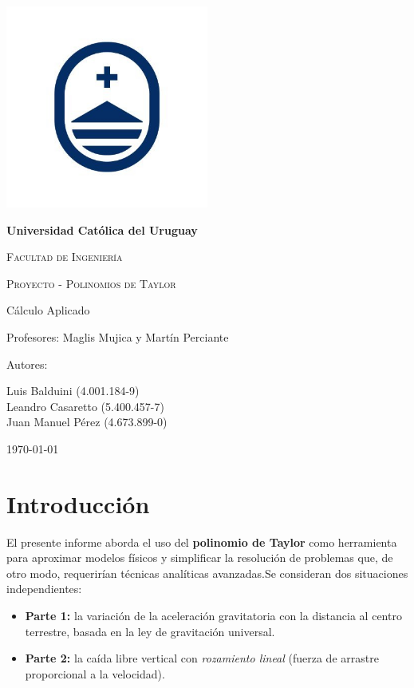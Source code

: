 \documentclass{article}
\begin{document}
    \begin{titlepage}
        \centering
        {\includegraphics[width=0.5\textwidth]{assets/logo2}\par}
        {\bfseries\LARGE Universidad Católica del Uruguay \par}
        \vspace{0.3cm}
        {\scshape\Large Facultad de Ingeniería \par}
        \vspace{0.3cm}
        {\scshape\Huge Proyecto - Polinomios de Taylor\par}
        \vspace{1cm}
        {\Large Cálculo Aplicado \par}
        {\Large Profesores: Maglis Mujica y Martín Perciante \par}
        \vfill
        {\Large Autores: \par}
        {\Large Luis Balduini (4.001.184-9)\\Leandro Casaretto (5.400.457-7)\\Juan Manuel Pérez (4.673.899-0) \par}
        \vfill
        {\Large \today \par}
    \end{titlepage}

    \section{Introducción}\label{sec:intro}
El presente informe aborda el uso del \textbf{polinomio de Taylor} como
herramienta para aproximar modelos físicos y simplificar la resolución de
problemas que, de otro modo, requerirían técnicas analíticas avanzadas.Se consideran dos situaciones independientes:

\begin{itemize}
\item \textbf{Parte 1:} la variación de la aceleración gravitatoria con la
distancia al centro terrestre, basada en la ley de gravitación universal.
\item \textbf{Parte 2:} la caída libre vertical con \emph{rozamiento lineal}
(fuerza de arrastre proporcional a la velocidad).
\end{itemize}
\end{document}
